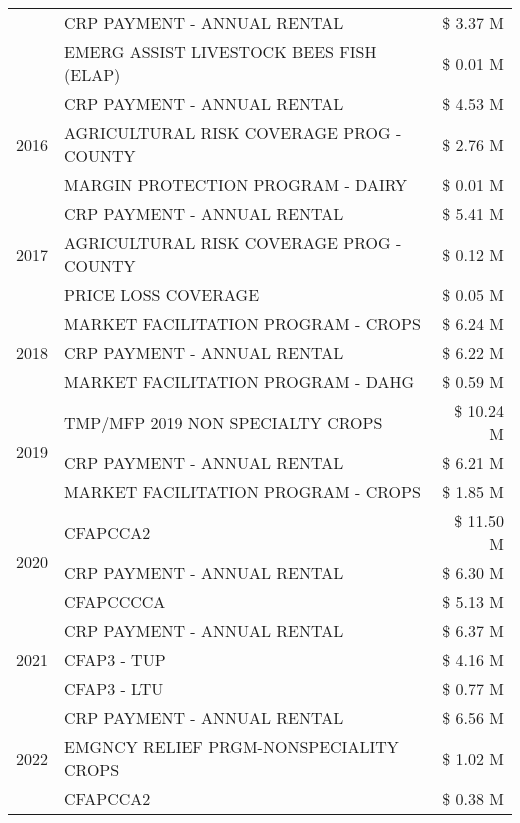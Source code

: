 \begin{tabular}{llr}
 & CRP PAYMENT - ANNUAL RENTAL & \$ 3.37 M \\
 & EMERG ASSIST LIVESTOCK BEES FISH (ELAP) & \$ 0.01 M \\
\cline{1-3}
\multirow[t]{3}{*}{2016} & CRP PAYMENT - ANNUAL RENTAL & \$ 4.53 M \\
 & AGRICULTURAL RISK COVERAGE PROG - COUNTY & \$ 2.76 M \\
 & MARGIN PROTECTION PROGRAM - DAIRY & \$ 0.01 M \\
\cline{1-3}
\multirow[t]{3}{*}{2017} & CRP PAYMENT - ANNUAL RENTAL & \$ 5.41 M \\
 & AGRICULTURAL RISK COVERAGE PROG - COUNTY & \$ 0.12 M \\
 & PRICE LOSS COVERAGE & \$ 0.05 M \\
\cline{1-3}
\multirow[t]{3}{*}{2018} & MARKET FACILITATION PROGRAM - CROPS & \$ 6.24 M \\
 & CRP PAYMENT - ANNUAL RENTAL & \$ 6.22 M \\
 & MARKET FACILITATION PROGRAM - DAHG & \$ 0.59 M \\
\cline{1-3}
\multirow[t]{3}{*}{2019} & TMP/MFP 2019 NON SPECIALTY CROPS & \$ 10.24 M \\
 & CRP PAYMENT - ANNUAL RENTAL & \$ 6.21 M \\
 & MARKET FACILITATION PROGRAM - CROPS & \$ 1.85 M \\
\cline{1-3}
\multirow[t]{3}{*}{2020} & CFAPCCA2 & \$ 11.50 M \\
 & CRP PAYMENT - ANNUAL RENTAL & \$ 6.30 M \\
 & CFAPCCCCA & \$ 5.13 M \\
\cline{1-3}
\multirow[t]{3}{*}{2021} & CRP PAYMENT - ANNUAL RENTAL & \$ 6.37 M \\
 & CFAP3 - TUP & \$ 4.16 M \\
 & CFAP3 - LTU & \$ 0.77 M \\
\cline{1-3}
\multirow[t]{3}{*}{2022} & CRP PAYMENT - ANNUAL RENTAL & \$ 6.56 M \\
 & EMGNCY RELIEF PRGM-NONSPECIALITY CROPS & \$ 1.02 M \\
 & CFAPCCA2 & \$ 0.38 M \\
\cline{1-3}
\bottomrule
\end{tabular}
